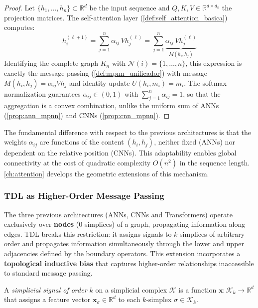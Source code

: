\begin{proof}
Let $\{h_1, \ldots, h_n\} \subset \mathbb{R}^d$ be the input sequence and $Q, K, V \in \mathbb{R}^{d \times d_k}$ the projection matrices. The self-attention layer (\autoref{def:self_attention_basica}) computes:
\[
h_i^{(\ell+1)} = \sum_{j=1}^n \alpha_{ij}\, V h_j^{(\ell)}
= \sum_{j=1}^n \underbrace{\alpha_{ij}\, V h_j^{(\ell)}}_{M(h_i, h_j)}
\]
Identifying the complete graph $K_n$ with $\mathcal{N}(i) = \{1, \ldots, n\}$, this expression is exactly the message passing (\autoref{def:mpnn_unificador}) with message $M(h_i, h_j) = \alpha_{ij} V h_j$ and identity update $U(h_i, m_i) = m_i$. The softmax normalization guarantees $\alpha_{ij} \in (0,1)$ with $\sum_{j=1}^n \alpha_{ij} = 1$, so that the aggregation is a convex combination, unlike the uniform sum of \glspl{ANN} (\autoref{prop:ann_mpnn}) and \glspl{CNN} (\autoref{prop:cnn_mpnn}).
\end{proof}

The fundamental difference with respect to the previous architectures is that the weights $\alpha_{ij}$ are functions of the content $(h_i, h_j)$, neither fixed (\glspl{ANN}) nor dependent on the relative position (\glspl{CNN}). This adaptability enables global connectivity at the cost of quadratic complexity $O(n^2)$ in the sequence length. \autoref{ch:attention} develops the geometric extensions of this mechanism.

\subsubsection{TDL as Higher-Order Message Passing}\label{subsubsec:tdl_mpnn_general}

The three previous architectures (\glspl{ANN}, \glspl{CNN} and \glspl{Transformer}) operate exclusively over \textbf{nodes} ($0$-simplices) of a graph, propagating information along edges. \gls{TDL} breaks this restriction: it assigns signals to $k$-simplices of arbitrary order and propagates information simultaneously through the lower and upper adjacencies defined by the boundary operators. This extension incorporates a \textbf{topological inductive bias} that captures higher-order relationships inaccessible to standard message passing.

\begin{definition}\label{def:senal_simplicial_gdl}
	A \textit{simplicial signal of order $k$} on a simplicial complex $\mathcal{K}$ is a function $\mathbf{x}: \mathcal{K}_k \to \mathbb{R}^d$ that assigns a feature vector $\mathbf{x}_\sigma \in \mathbb{R}^d$ to each $k$-simplex $\sigma \in \mathcal{K}_k$.
\end{definition}

